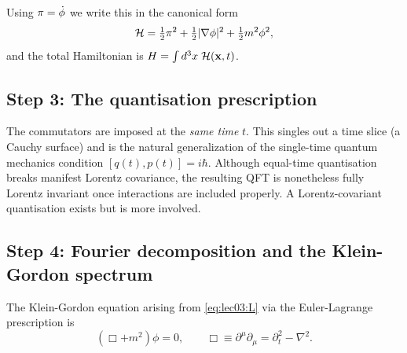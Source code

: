 Using $\pi=\dot{\phi}$ we write this in the canonical form
\begin{equation}
  \mathcal{H}
  = \tfrac{1}{2}\pi^2
    + \tfrac{1}{2}|\nabla\phi|^2
    + \tfrac{1}{2}m^2\phi^2,
\end{equation}
and the total Hamiltonian is
$H = \int d^3x\;\mathcal{H}(\mathbf{x},t)$.

\subsection*{Step 3: The quantisation prescription}


\begin{remark}
The commutators are imposed at the \emph{same time} $t$.  This singles
out a time slice (a Cauchy surface) and is the natural generalization of
the single-time quantum mechanics condition $[q(t),p(t)]=i\hbar$.
Although equal-time quantisation breaks manifest Lorentz covariance, the
resulting QFT is nonetheless fully Lorentz invariant once interactions
are included properly.  A Lorentz-covariant quantisation
exists but is more involved.
\end{remark}

\subsection*{Step 4: Fourier decomposition and the Klein-Gordon spectrum}

The Klein-Gordon equation arising from \eqref{eq:lec03:L} via
the Euler-Lagrange prescription is
\begin{equation}
  (\Box + m^2)\phi = 0,
  \qquad
  \Box \equiv \partial^\mu\partial_\mu
             = \partial_t^2 - \nabla^2.
  \label{eq:lec03:KG}
\end{equation}

